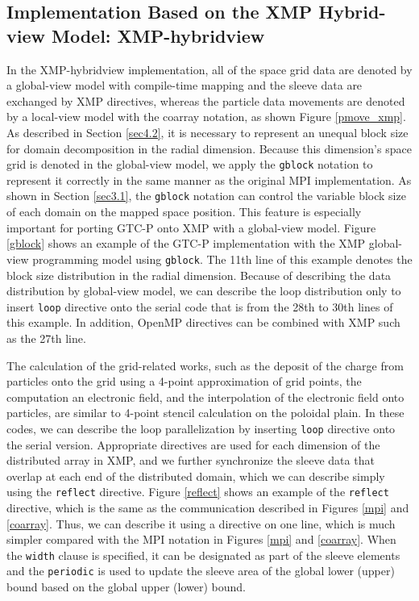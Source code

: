 \subsection{Implementation Based on the XMP Hybrid-view Model: XMP-hybridview}
In the XMP-hybridview implementation, all of the space grid data are denoted by a global-view model with compile-time mapping and the sleeve data are exchanged by XMP directives, whereas the particle data movements are denoted by a local-view model with the coarray notation, as shown Figure \ref{pmove_xmp}. As described in Section \ref{sec4.2}, it is necessary to represent an unequal block size for domain decomposition in the radial dimension. Because this dimension's space grid is denoted in the global-view model, we apply the {\tt gblock} notation to represent it correctly in the same manner as the original MPI implementation. As shown in Section \ref{sec3.1}, the {\tt gblock} notation can control the variable block size of each domain on the mapped space position. This feature is especially important for porting GTC-P onto XMP with a global-view model. Figure \ref{gblock} shows an example of the GTC-P implementation with the XMP global-view programming model using {\tt gblock}. The 11th line of this example denotes the block size distribution in the radial dimension. Because of describing the data distribution by global-view model, we can describe the loop distribution only to insert \texttt{loop} directive onto the serial code that is from the 28th to 30th lines of this example. In addition, OpenMP directives can be combined with XMP such as the 27th line.

The calculation of the grid-related works, such as the deposit of the charge from particles onto the grid using a 4-point approximation of grid points, the computation an electronic field, and the interpolation of the electronic field onto particles, are similar to 4-point stencil calculation on the poloidal plain. In these codes, we can describe the loop parallelization by inserting {\tt loop} directive onto the serial version. Appropriate directives are used for each dimension of the distributed array in XMP, and we further synchronize the sleeve data that overlap at each end of the distributed domain, which we can describe simply using the {\tt reflect} directive. Figure \ref{reflect} shows an example of the {\tt reflect} directive, which is the same as the communication described in Figures \ref{mpi} and \ref{coarray}. Thus, we can describe it using a directive on one line, which is much simpler compared with the MPI notation in Figures \ref{mpi} and \ref{coarray}. When the {\tt width} clause is specified, it can be designated as part of the sleeve elements and the {\tt periodic} is used to update the sleeve area of the global lower (upper) bound based on the global upper (lower) bound.



